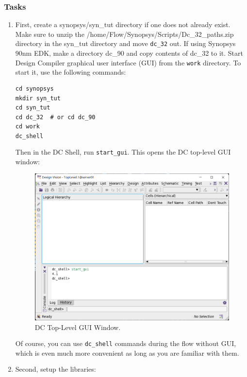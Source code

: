 \documentclass[a4paper,12pt,twoside]{article}
\begin{document}
\subsubsection{Tasks}\label{SDCTask}
\begin{enumerate}
    \item First, create a synopsys/syn\_tut directory if one does not already exist. Make sure to unzip the /home/Flow/Synopsys/Scripts/Dc\_32\_paths.zip directory in the syn\_tut directory and move \texttt{dc\_32} out.
    If using Synopsys 90nm EDK, make a directory dc\_90 and copy contents of dc\_32 to it. Start Design Compiler graphical user interface (GUI) from the \texttt{work} directory. To start it, use the following commands:
    \begin{verbatim}
cd synopsys
mkdir syn_tut
cd syn_tut
cd dc_32  # or cd dc_90
cd work
dc_shell
    \end{verbatim}
    Then in the DC Shell, run \texttt{start\_gui}. This opens the DC top-level GUI window:
    \begin{figure}[H]
        \centering
        \includegraphics[width=\textwidth]{images/17.png}
        \caption{DC Top-Level GUI Window.}
    \end{figure}
    Of course, you can use \texttt{dc\_shell} commands during the flow without GUI, which is even much more convenient as long as you are familiar with them.
    \item Second, setup the libraries:\\

\end{enumerate}
\end{document}
